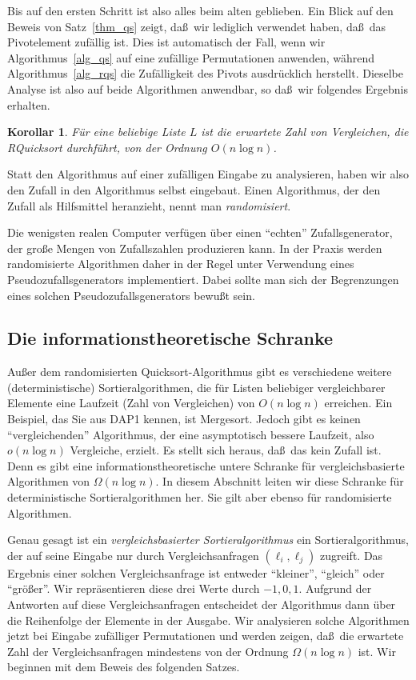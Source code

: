 \documentclass[10pt,reqno]{amsart}
\numberwithin{equation}{section}
\newtheorem{corollary}[definition]{Korollar}
\newcommand\Thm{Satz}
\begin{document}
Bis auf den ersten Schritt ist also alles beim alten geblieben.
Ein Blick auf den Beweis von \Thm~\ref{thm_qs} zeigt, da\ss\ wir lediglich verwendet haben, da\ss\ das Pivotelement zuf\"allig ist.
Dies ist automatisch der Fall, wenn wir Algorithmus~\ref{alg_qs} auf eine zuf\"allige Permutationen anwenden, w\"ahrend Algorithmus~\ref{alg_rqs} die Zuf\"alligkeit des Pivots ausdr\"ucklich herstellt.
Dieselbe Analyse ist also auf beide Algorithmen anwendbar, so da\ss\ wir folgendes Ergebnis erhalten.

\begin{corollary}\label{cor_qs}
	F\"ur eine beliebige Liste $L$ ist die erwartete Zahl von Vergleichen, die RQuicksort durchf\"uhrt, von der Ordnung $O(n\log n)$.
\end{corollary}

Statt den Algorithmus auf einer zuf\"alligen Eingabe zu analysieren, haben wir also den Zufall in den Algorithmus selbst eingebaut.
Einen Algorithmus, der den Zufall als Hilfsmittel heranzieht, nennt man {\em randomisiert}.

Die wenigsten realen Computer verf\"ugen \"uber einen ``echten'' Zufallsgenerator, der gro\ss e Mengen von Zufallszahlen produzieren kann.
In der Praxis werden randomisierte Algorithmen daher in der Regel unter Verwendung eines Pseudozufallsgenerators implementiert.
Dabei sollte man sich der Begrenzungen eines solchen Pseudozufallsgenerators bewu\ss t sein.

\subsection{Die informationstheoretische Schranke}\label{sec_inf}
Au\ss er dem randomisierten Quicksort-Algorithmus gibt es verschiedene weitere (deterministische) Sortieralgorithmen, die f\"ur Listen beliebiger vergleichbarer Elemente eine Laufzeit (Zahl von Vergleichen) von $O(n\log n)$ erreichen.
Ein Beispiel, das Sie aus DAP1 kennen, ist Mergesort.
Jedoch gibt es keinen ``vergleichenden'' Algorithmus, der eine asymptotisch bessere Laufzeit, also $o(n\log n)$ Vergleiche, erzielt.
Es stellt sich heraus, da\ss\ das kein Zufall ist.
Denn es gibt eine informationstheoretische untere Schranke f\"ur vergleichsbasierte Algorithmen von $\Omega(n\log n)$.
In diesem Abschnitt leiten wir diese Schranke f\"ur deterministische Sortieralgorithmen her.
Sie gilt aber ebenso f\"ur randomisierte Algorithmen.

Genau gesagt ist ein {\em vergleichsbasierter Sortieralgorithmus} ein Sortieralgorithmus, der auf seine Eingabe nur durch Vergleichsanfragen $(\ell_i,\ell_j)$ zugreift.
Das Ergebnis einer solchen Vergleichsanfrage ist entweder ``kleiner'', ``gleich'' oder ``gr\"o\ss er''.
Wir repr\"asentieren diese drei Werte durch $-1,0,1$.
Aufgrund der Antworten auf diese Vergleichsanfragen entscheidet der Algorithmus dann \"uber die Reihenfolge der Elemente in der Ausgabe.
Wir analysieren solche Algorithmen jetzt bei Eingabe zuf\"alliger Permutationen und werden zeigen, da\ss\ die erwartete Zahl der Vergleichsanfragen mindestens von der Ordnung $\Omega(n\log n)$ ist.
Wir beginnen mit dem Beweis des folgenden Satzes.
\end{document}
